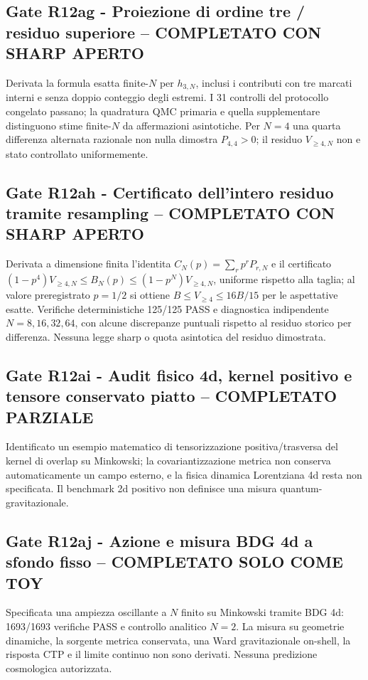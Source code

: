 \documentclass[11pt,a4paper]{article}
\begin{document}
\subsection*{Gate R12ag - Proiezione di ordine tre / residuo superiore -- COMPLETATO CON SHARP APERTO}
Derivata la formula esatta finite-$N$ per $h_{3,N}$, inclusi i contributi con tre marcati interni e senza doppio conteggio degli estremi. I 31 controlli del protocollo congelato passano; la quadratura QMC primaria e quella supplementare distinguono stime finite-$N$ da affermazioni asintotiche. Per $N=4$ una quarta differenza alternata razionale non nulla dimostra $P_{4,4}>0$; il residuo $V_{\ge4,N}$ non e stato controllato uniformemente.

\subsection*{Gate R12ah - Certificato dell'intero residuo tramite resampling -- COMPLETATO CON SHARP APERTO}
Derivata a dimensione finita l'identita $C_N(p)=\sum_rp^rP_{r,N}$ e il certificato $(1-p^4)V_{\ge4,N}\le B_N(p)\le(1-p^N)V_{\ge4,N}$, uniforme rispetto alla taglia; al valore preregistrato $p=1/2$ si ottiene $B\le V_{\ge4}\le16B/15$ per le aspettative esatte. Verifiche deterministiche 125/125 PASS e diagnostica indipendente $N=8,16,32,64$, con alcune discrepanze puntuali rispetto al residuo storico per differenza. Nessuna legge sharp o quota asintotica del residuo dimostrata.

\subsection*{Gate R12ai - Audit fisico 4d, kernel positivo e tensore conservato piatto -- COMPLETATO PARZIALE}
Identificato un esempio matematico di tensorizzazione positiva/trasversa del kernel di overlap su Minkowski; la covariantizzazione metrica non conserva automaticamente un campo esterno, e la fisica dinamica Lorentziana 4d resta non specificata. Il benchmark 2d positivo non definisce una misura quantum-gravitazionale.

\subsection*{Gate R12aj - Azione e misura BDG 4d a sfondo fisso -- COMPLETATO SOLO COME TOY}
Specificata una ampiezza oscillante a $N$ finito su Minkowski tramite BDG 4d: 1693/1693 verifiche PASS e controllo analitico $N=2$. La misura su geometrie dinamiche, la sorgente metrica conservata, una Ward gravitazionale on-shell, la risposta CTP e il limite continuo non sono derivati. Nessuna predizione cosmologica autorizzata.
\end{document}
